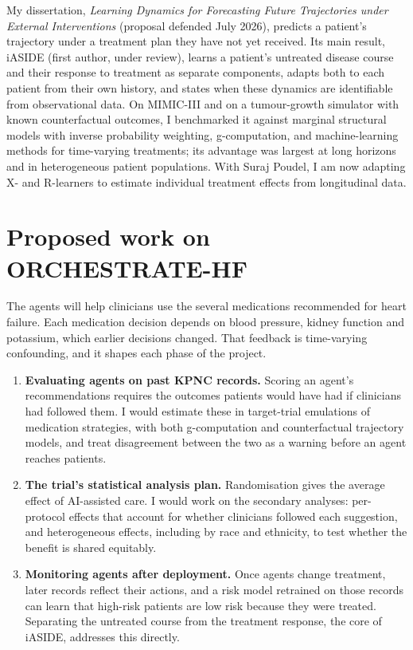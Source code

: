 \documentclass[11pt, letterpaper]{article}
\begin{document}
    My dissertation, \textit{Learning Dynamics for Forecasting Future Trajectories under External Interventions}
    (proposal defended July 2026), predicts a patient's trajectory under a treatment plan they have not yet
    received. Its main result, iASIDE (first author, under review), learns a patient's untreated disease course
    and their response to treatment as separate components, adapts both to each patient from their own history,
    and states when these dynamics are identifiable from observational data. On MIMIC-III and on a tumour-growth
    simulator with known counterfactual outcomes, I benchmarked it against marginal structural models with
    inverse probability weighting, g-computation, and machine-learning methods for time-varying treatments; its
    advantage was largest at long horizons and in heterogeneous patient populations. With Suraj Poudel, I am now
    adapting X- and R-learners to estimate individual treatment effects from longitudinal data.


    \section{Proposed work on ORCHESTRATE-HF}

    The agents will help clinicians use the several medications recommended for heart failure. Each medication
    decision depends on blood pressure, kidney function and potassium, which earlier decisions changed. That feedback is time-varying confounding, and it shapes each phase of the project.

    \begin{enumerate}[leftmargin=0.6 cm, topsep=0pt, itemsep=0.3em, parsep=0pt]
        \item \textbf{Evaluating agents on past KPNC records.} Scoring an agent's recommendations requires the
        outcomes patients would have had if clinicians had followed them. I would estimate these in target-trial
        emulations of medication strategies, with both g-computation and counterfactual trajectory models, and
        treat disagreement between the two as a warning before an agent reaches patients.
        \item \textbf{The trial's statistical analysis plan.} Randomisation gives the average effect of
        AI-assisted care. I would work on the secondary analyses: per-protocol effects that account for whether
        clinicians followed each suggestion, and heterogeneous effects, including by race and ethnicity, to test
        whether the benefit is shared equitably.
        \item \textbf{Monitoring agents after deployment.} Once agents change treatment, later records reflect
        their actions, and a risk model retrained on those records can learn that high-risk patients are low risk
        because they were treated. Separating the untreated course from the treatment response, the core of
        iASIDE, addresses this directly.
    \end{enumerate}
\end{document}
